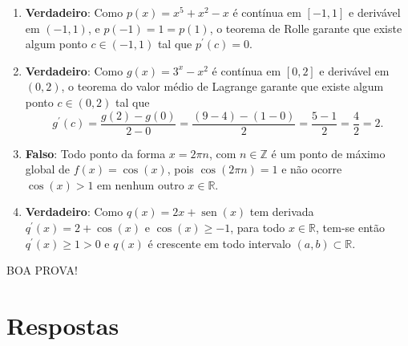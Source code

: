 \documentclass[12pt,a4paper]{article}
\newcommand*\sen{\operatorname{sen}}
\newcommand*\R{\mathbb{R}}
\begin{document}
\begin{ExerciseList}
\Answer \begin{enumerate}
  \item \textbf{Verdadeiro}: Como $p(x) = x^5 + x^2 - x$ é contínua em $[-1, 1]$ e derivável em $(-1, 1)$, e $p(-1) = 1 = p(1)$, o teorema de Rolle garante que existe algum ponto $c \in (-1, 1)$ tal que $p^\prime(c) = 0$.
  \item \textbf{Verdadeiro}: Como $g(x) = 3^x - x^2$ é contínua em $[0, 2]$ e derivável em $(0, 2)$, o teorema do valor médio de Lagrange garante que existe algum ponto $c \in (0, 2)$ tal que
  \[
  g^\prime(c)
  = \frac{g(2) - g(0)}{2 - 0}
  = \frac{(9-4) - (1-0)}{2}
  = \frac{5 - 1}{2}
  = \frac{4}{2}
  = 2.
  \]
  \item \textbf{Falso}: Todo ponto da forma $x = 2 \pi n$, com $n \in \mathbb{Z}$ é um ponto de máximo global de $f(x) = \cos(x)$, pois $\cos(2 \pi n) = 1$ e não ocorre $\cos(x) > 1$ em nenhum outro $x \in \R$.
  \item \textbf{Verdadeiro}: Como $q(x) = 2x + \sen(x)$ tem derivada $q^\prime(x) = 2 + \cos(x)$ e $\cos(x) \geq -1$, para todo $x \in \R$, tem-se então $q^\prime(x) \geq 1 > 0$ e $q(x)$ é crescente em todo intervalo $(a, b) \subset \R$.
\end{enumerate}
\end{ExerciseList}

\begin{center}
BOA PROVA!
\end{center}

\newpage
\restoregeometry
\section*{Respostas}
\shipoutAnswer
\end{document}
